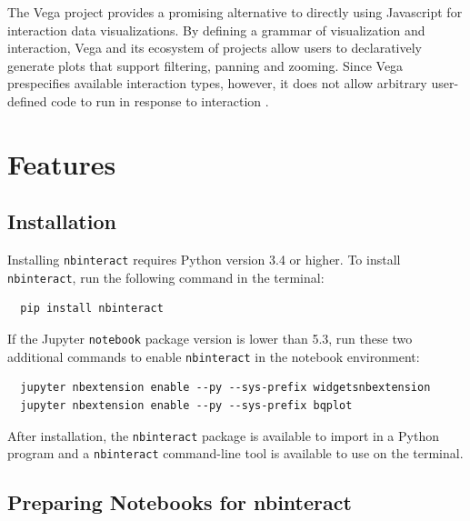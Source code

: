 \documentclass[nobib]{tufte-handout}
\newcommand{\code}[1]{\texttt{#1}}
\begin{document}
The Vega project provides a promising alternative to directly using Javascript
for interaction data visualizations. By defining a grammar of visualization and
interaction, Vega and its ecosystem of projects allow users to declaratively
generate plots that support filtering, panning and zooming. Since Vega
prespecifies available interaction types, however, it does not allow arbitrary
user-defined code to run in response to interaction
\cite{satyanarayan_reactive_2016}.



\section{Features} %
\label{sec:features}

\subsection{Installation} %
\label{sub:installation}

Installing \code{nbinteract} requires Python version 3.4 or higher. To install
\code{nbinteract}, run the following command in the terminal:

\begin{verbatim}
  pip install nbinteract
\end{verbatim}

If the Jupyter \code{notebook} package version is lower than 5.3, run these two
additional commands to enable \code{nbinteract} in the notebook environment:

\begin{verbatim}
  jupyter nbextension enable --py --sys-prefix widgetsnbextension
  jupyter nbextension enable --py --sys-prefix bqplot
\end{verbatim}

After installation, the \code{nbinteract} package is available to import in a
Python program and a \code{nbinteract} command-line tool is available to use on
the terminal.


\subsection{Preparing Notebooks for nbinteract} %
\label{sub:preparing_notebooks_for_nbinteract}
\end{document}
